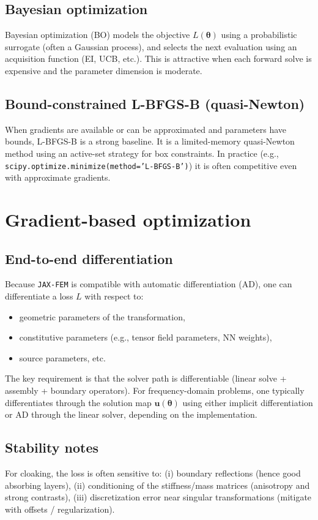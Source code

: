 \documentclass[11pt,a4paper]{report}
\begin{document}
\subsection{Bayesian optimization}
Bayesian optimization (BO) models the objective $L(\bm\theta)$ using a probabilistic surrogate (often a Gaussian process),
and selects the next evaluation using an acquisition function (EI, UCB, etc.).
This is attractive when each forward solve is expensive and the parameter dimension is moderate.

\subsection{Bound-constrained L-BFGS-B (quasi-Newton)}
When gradients are available or can be approximated and parameters have bounds,
L-BFGS-B is a strong baseline. It is a limited-memory quasi-Newton method using an active-set strategy for box constraints.
In practice (e.g., \texttt{scipy.optimize.minimize(method='L-BFGS-B')}) it is often competitive even with approximate gradients.

\section{Gradient-based optimization}
\subsection{End-to-end differentiation}
Because \texttt{JAX-FEM} is compatible with automatic differentiation (AD),
one can differentiate a loss $L$ with respect to:
\begin{itemize}
\item geometric parameters of the transformation,
\item constitutive parameters (e.g., tensor field parameters, NN weights),
\item source parameters, etc.
\end{itemize}
The key requirement is that the solver path is differentiable (linear solve + assembly + boundary operators).
For frequency-domain problems, one typically differentiates through the solution map $\bm u(\bm\theta)$ using
either implicit differentiation or AD through the linear solver, depending on the implementation.

\subsection{Stability notes}
For cloaking, the loss is often sensitive to:
(i) boundary reflections (hence good absorbing layers),
(ii) conditioning of the stiffness/mass matrices (anisotropy and strong contrasts),
(iii) discretization error near singular transformations (mitigate with offsets / regularization).
\end{document}
